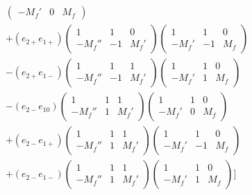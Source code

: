 \begin{align}
\begin{split}
\begin{pmatrix}
            -M_f' & 0 &M_f
            \end{pmatrix}\\
            +
            (e_{2+}e_{1+})
            \begin{pmatrix}
             1    & 1 & 0\\
            -M_f'' & -1 &M_f'
            \end{pmatrix}
            \begin{pmatrix}
            1    & 1 & 0\\
            -M_f' & -1 &M_f
            \end{pmatrix}\\
            -
            (e_{2+}e_{1-})
            \begin{pmatrix}
             1    & 1 & 1\\
            -M_f'' & -1 &M_f'
            \end{pmatrix}
            \begin{pmatrix}
            1    & 1 & 0\\
            -M_f' & 1 &M_f
            \end{pmatrix}\\
            -
            (e_{2-}e_{10})
            \begin{pmatrix}
             1    & 1 & 1\\
            -M_f'' & 1 &M_f'
            \end{pmatrix}
            \begin{pmatrix}
            1    & 1 & 0\\
            -M_f' & 0 &M_f
            \end{pmatrix}\\
            +
            (e_{2-}e_{1+})
            \begin{pmatrix}
             1    & 1 & 1\\
            -M_f'' & 1 &M_f'
            \end{pmatrix}
            \begin{pmatrix}
            1    & 1 & 0\\
            -M_f' & -1 &M_f
            \end{pmatrix}\\
            +
            (e_{2-}e_{1-})
            \begin{pmatrix}
             1    & 1 & 1\\
            -M_f'' & 1 &M_f'
            \end{pmatrix}
            \begin{pmatrix}
            1    & 1 & 0\\
            -M_f' & 1 &M_f
            \end{pmatrix}
            ]
    \end{split}
\end{align}

